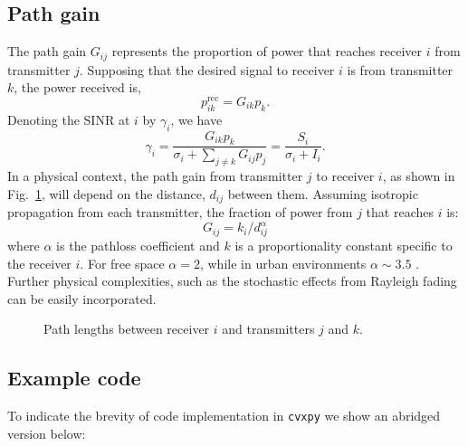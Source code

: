 \documentclass[twocolumn,secnumarabic,amssymb, nobibnotes, aps, prl,superscriptaddress]{revtex4-1}
\begin{document}
\subsection{Path gain}
The path gain $G_{ij}$ represents the proportion of power that reaches receiver $i$ from transmitter $j$. Supposing that the desired signal to receiver $i$ is from transmitter $k$, the power received is,
\begin{equation}
p_{ik}^{\text{rec}} = G_{ik}p_k.
\end{equation}
Denoting the SINR at $i$ by $\gamma_i$, we have
\begin{equation}
\gamma_i = \frac{G_{ik}p_k}{\sigma_i+\sum_{j\neq k}G_{ij}p_j}
=\frac{S_i}{\sigma_i+I_i}.
\end{equation}
In a physical context, the path gain from transmitter $j$ to receiver $i$, as shown in Fig.~\ref{fig:pathgain}, will depend on the distance, $d_{ij}$ between them. Assuming isotropic propagation from each transmitter, the fraction of power from $j$ that reaches $i$ is:
\begin{equation}
G_{ij} = k_i/d_{ij}^\alpha
\end{equation}
where $\alpha$ is the pathloss coefficient and $k$ is a proportionality constant specific to the receiver $i$.  For free space $\alpha = 2$, while in urban environments $\alpha \sim 3.5$ \cite{hata1980}. Further physical complexities, such as the stochastic effects from Rayleigh fading can be easily incorporated.

\begin{figure}[H]
\centering
{}
\caption{\label{fig:pathgain}Path lengths between receiver $i$ and transmitters $j$ and $k$.}
\end{figure}

\subsection{Example code}
To indicate the brevity of code implementation in \texttt{cvxpy} we show an abridged version below: 
\end{document}
